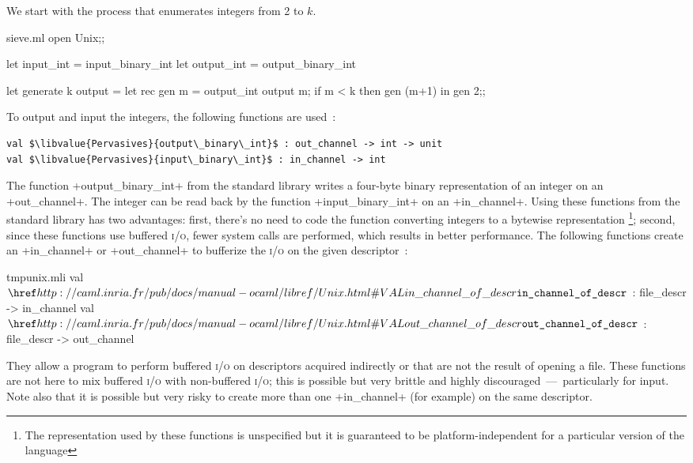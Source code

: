 We start with the process that enumerates integers from 2 to $k$.
%
\begin{listingcodefile}{sieve.ml}
open Unix;;

let input_int = input_binary_int
let output_int = output_binary_int

let generate k output =
  let rec gen m =
    output_int output m;
    if m < k then gen (m+1)
  in 
  gen 2;;
\end{listingcodefile}
To output and input the integers, the following functions are used~:
%
\begin{lstlisting}
val $\libvalue{Pervasives}{output\_binary\_int}$ : out_channel -> int -> unit
val $\libvalue{Pervasives}{input\_binary\_int}$ : in_channel -> int
\end{lstlisting}
%
The function \ml+output_binary_int+ from the standard library writes a
four-byte binary representation of an integer on an
\ml+out_channel+. The integer can be read back by the function
\ml+input_binary_int+ on an \ml+in_channel+. Using these functions
from the standard library has two advantages: first, there's no need to
code the function converting integers to a bytewise representation
\footnote{The representation used by these functions is unspecified but it is
  guaranteed to be platform-independent
  for a particular version of the language}; second, since
these functions use buffered \textsc{i/o}, fewer system calls are
performed, which results in better performance. The following functions
create an \ml+in_channel+ or \ml+out_channel+ to bufferize the 
\textsc{i/o} on the given descriptor~:
%
\begin{listingcodefile}{tmpunix.mli}
val $\indexlibvalue{Unix}{in\_channel\_of\_descr}$ : file_descr -> in_channel
val $\indexlibvalue{Unix}{out\_channel\_of\_descr}$ : file_descr -> out_channel
\end{listingcodefile}
%
They allow a program to perform buffered \textsc{i/o} on descriptors acquired
indirectly or that are not the result of opening a file. These
functions are not here to mix buffered \textsc{i/o} with non-buffered
\textsc{i/o}; this is possible but very brittle and highly
discouraged~---~particularly for input. Note also that it is possible
but very risky to create more than one \ml+in_channel+ (for example)
on the same descriptor.

